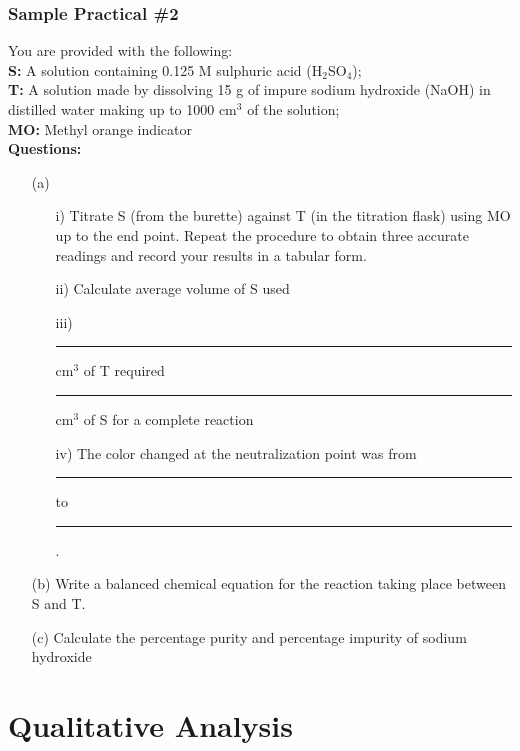 \subsubsection{Sample Practical \#2}

\noindent You are provided with the following:\\
\noindent \textbf{S:} A solution containing 0.125 M sulphuric acid (H$_2$SO$_4$); \\
\noindent \textbf{T:} A solution made by dissolving 15 g of impure sodium hydroxide (NaOH) in distilled water making up to 1000 cm$^3$ of the solution; \\
\noindent \textbf{MO:} Methyl orange indicator \\

\noindent \textbf{Questions:} 
\begin{enumerate}[topsep=0ex,itemsep=0ex,partopsep=1ex,parsep=1ex]
	\item[(a)] 
	\begin{enumerate}[topsep=0ex,itemsep=0ex,partopsep=1ex,parsep=1ex]
		\item[i)] Titrate S (from the burette) against T (in the titration flask) using MO up to the end point. Repeat the procedure to obtain three accurate readings and record your results in a tabular form. 
		\item[ii)] Calculate average volume of S used
		\item[iii)] \rule{1.5cm}{0.15mm} cm$^3$ of T required \rule{1.5cm}{0.15mm} cm$^3$ of S for a complete reaction
		\item[iv)] The color changed at the neutralization point was from \rule{1.5cm}{0.15mm} to \rule{1.5cm}{0.15mm}.
	\end{enumerate}
	\item[(b)] Write a balanced chemical equation for the reaction taking place between S and T.
	\item[(c)] Calculate the percentage purity and percentage impurity of sodium hydroxide
\end{enumerate}

\clearpage

\section{Qualitative Analysis}  
\label{cha:qualana}

